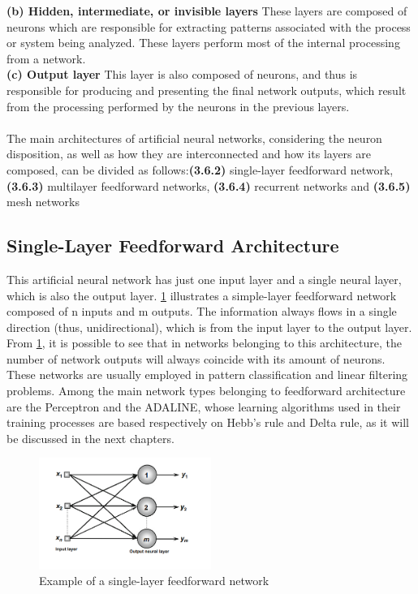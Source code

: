 \textbf{(b) Hidden, intermediate, or invisible layers}
These layers are composed of neurons which are responsible for extracting patterns associated with the process or system being analyzed. These layers perform most of the internal processing from a network.\\

\textbf{(c) Output layer}
This layer is also composed of neurons, and thus is responsible for producing and presenting the final network outputs, which result from the processing performed by the neurons in the previous layers.
\\
\\
The main architectures of artificial neural networks, considering the neuron disposition, as well as how they are interconnected and how its layers are composed, can be divided as follows:\textbf{(3.6.2)} single-layer feedforward network,\textbf{(3.6.3)} multilayer feedforward networks, \textbf{(3.6.4)} recurrent networks and \textbf{(3.6.5)} mesh networks

\subsection{Single-Layer Feedforward Architecture}
This artificial neural network has just one input layer and a single neural layer,
which is also the output layer. \ref{fig:ann1} illustrates a simple-layer feedforward network composed of n inputs and m outputs.
The information always flows in a single direction (thus, unidirectional), which is from the input layer to the output layer. From \ref{fig:ann1}, it is possible to see that in networks belonging to this architecture, the number of network outputs will always
coincide with its amount of neurons. These networks are usually employed in pattern classification and linear filtering problems.
Among the main network types belonging to feedforward architecture are the Perceptron and the ADALINE, whose learning algorithms used in their training processes are based respectively on Hebb’s rule and Delta rule, as it will be discussed
in the next chapters.


\begin{figure}[H]
\centering
\includegraphics[width=0.5\textwidth]{img/ann1.PNG}
\caption{  Example of a single-layer feedforward network }
\label{fig:ann1}
\end{figure}


